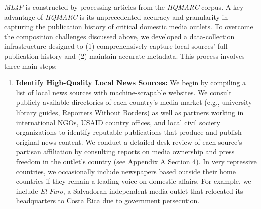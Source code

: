 \documentclass[
  letterpaper,
  DIV=11,
  numbers=noendperiod]{scrartcl}
\begin{document}
\emph{ML4P} is constructed by processing articles from the \emph{HQMARC}
corpus. A key advantage of \emph{HQMARC} is its unprecedented accuracy
and granularity in capturing the publication history of critical
domestic media outlets. To overcome the composition challenges discussed
above, we developed a data-collection infrastructure designed to (1)
comprehensively capture local sources' full publication history and (2)
maintain accurate metadata. This process involves three main steps:

\begin{enumerate}
\def\labelenumi{\arabic{enumi}.}
\item
  \textbf{Identify High-Quality Local News Sources:} We begin by
  compiling a list of local news sources with machine-scrapable
  websites. We consult publicly available directories of each country's
  media market (e.g., university library guides, Reporters Without
  Borders) as well as partners working in international NGOs, USAID
  country offices, and local civil society organizations to identify
  reputable publications that produce and publish original news content.
  We conduct a detailed desk review of each source's partisan
  affiliation by consulting reports on media ownership and press freedom
  in the outlet's country (see Appendix A Section 4). In very repressive
  countries, we occasionally include newspapers based outside their home
  countries if they remain a leading voice on domestic affairs. For
  example, we include \emph{El Faro}, a Salvadoran independent media
  outlet that relocated its headquarters to Costa Rica due to government
  persecution.


\end{enumerate}
\end{document}
